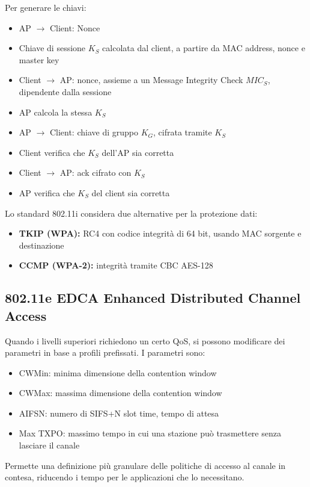 Per generare le chiavi: 
\begin{itemize}
    \item AP $\rightarrow$ Client: Nonce
    
    \item Chiave di sessione $K_S$ calcolata dal client, a partire da MAC address, nonce e master key
    
    \item Client $\rightarrow$ AP: nonce, assieme a un Message Integrity Check $MIC_S$, dipendente dalla sessione
    
    \item AP calcola la stessa $K_S$
    
    \item AP $\rightarrow$ Client: chiave di gruppo $K_G$, cifrata tramite $K_S$
    
    \item Client verifica che $K_S$ dell'AP sia corretta
    
    \item Client $\rightarrow$ AP: ack cifrato con $K_S$
    
    \item AP verifica che $K_S$ del client sia corretta
\end{itemize}

Lo standard 802.11i considera due alternative per la protezione dati: 
\begin{itemize}
    \item \textbf{TKIP (WPA):} RC4 con codice integrità di 64 bit, usando MAC sorgente e destinazione
    
    \item \textbf{CCMP (WPA-2):} integrità tramite CBC AES-128
\end{itemize}

\subsection{802.11e EDCA Enhanced Distributed Channel Access}

Quando i livelli superiori richiedono un certo QoS, si possono modificare dei parametri in base a profili prefissati. I parametri sono:
\begin{itemize}
    \item CWMin: minima dimensione della contention window
    
    \item CWMax: massima dimensione della contention window
    
    \item AIFSN: numero di SIFS+N slot time, tempo di attesa
    
    \item Max TXPO: massimo tempo in cui una stazione può trasmettere senza lasciare il canale
\end{itemize}

Permette una definizione più granulare delle politiche di accesso al canale in contesa, riducendo i tempo per le applicazioni che lo necessitano.